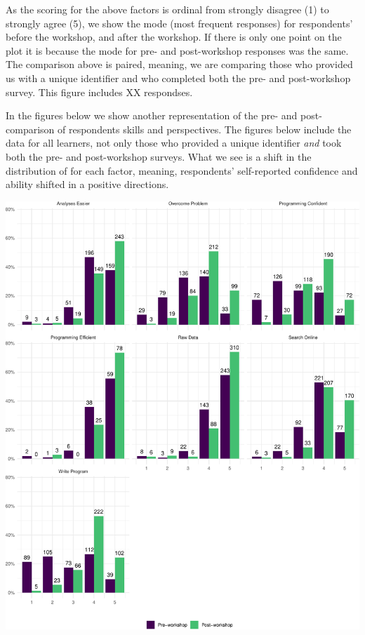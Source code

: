 \documentclass[]{article}
\begin{document}
As the scoring for the above factors is ordinal from strongly disagree
(1) to strongly agree (5), we show the mode (most frequent responses)
for respondents' before the workshop, and after the workshop. If there
is only one point on the plot it is because the mode for pre- and
post-workshop responses was the same. The comparison above is paired,
meaning, we are comparing those who provided us with a unique identifier
and who completed both the pre- and post-workshop survey. This figure
includes XX respondses.

In the figures below we show another representation of the pre- and
post-comparison of respondents skills and perspectives. The figures
below include the data for all learners, not only those who provided a
unique identifier \emph{and} took both the pre- and post-workshop
surveys. What we see is a shift in the distribution of for each factor,
meaning, respondents' self-reported confidence and ability shifted in a
positive directions.

\includegraphics[width=720]{figures/dc-paired-distribution-comparison-1}
\end{document}
